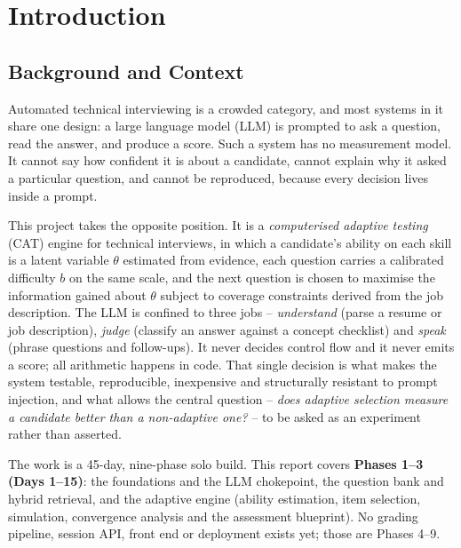 \documentclass{tietreport}
\author{\texttt{1024030854} Bhavik Gupta}
\begin{document}
\maketitle
{\small\setcounter{tocdepth}{1}\tableofcontents}

\chapter{Introduction}
\label{ch:intro}

\section{Background and Context}

Automated technical interviewing is a crowded category, and most systems in it share one
design: a large language model (LLM) is prompted to ask a question, read the answer, and
produce a score. Such a system has no measurement model. It cannot say how confident it is
about a candidate, cannot explain why it asked a particular question, and cannot be
reproduced, because every decision lives inside a prompt.

This project takes the opposite position. It is a \emph{computerised adaptive testing} (CAT)
engine \cite{vanderlinden2000cat,lord1980irt} for technical interviews, in which a candidate's
ability on each skill is a latent variable $\theta$ estimated from evidence, each question
carries a calibrated difficulty $b$ on the same scale, and the next question is chosen to
maximise the information gained about $\theta$ subject to coverage constraints derived from
the job description. The LLM is confined to three jobs -- \emph{understand} (parse a resume or
job description), \emph{judge} (classify an answer against a concept checklist) and
\emph{speak} (phrase questions and follow-ups). It never decides control flow and it never
emits a score; all arithmetic happens in code. That single decision is what makes the system
testable, reproducible, inexpensive and structurally resistant to prompt injection, and what
allows the central question -- \emph{does adaptive selection measure a candidate better than a
non-adaptive one?} -- to be asked as an experiment rather than asserted.

The work is a 45-day, nine-phase solo build. This report covers \textbf{Phases 1--3 (Days
1--15)}: the foundations and the LLM chokepoint, the question bank and hybrid retrieval, and
the adaptive engine (ability estimation, item selection, simulation, convergence analysis and
the assessment blueprint). No grading pipeline, session API, front end or deployment exists
yet; those are Phases 4--9.
\end{document}
